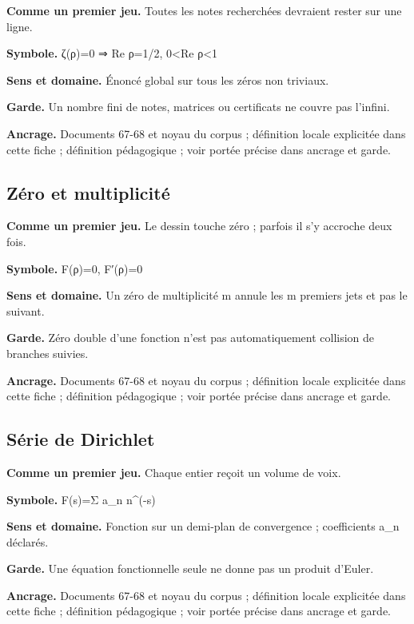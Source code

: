 \documentclass[
  9pt,
  a4paper,
]{article}
\begin{document}
\textbf{Comme un premier jeu.} Toutes les notes recherchées devraient
rester sur une ligne.

\textbf{Symbole.} ζ(ρ)=0 ⇒ Re ρ=1/2, 0\textless Re ρ\textless1

\textbf{Sens et domaine.} Énoncé global sur tous les zéros non triviaux.

\textbf{Garde.} Un nombre fini de notes, matrices ou certificats ne
couvre pas l'infini.

\textbf{Ancrage.} Documents 67-68 et noyau du corpus ; définition locale
explicitée dans cette fiche ; définition pédagogique ; voir portée
précise dans ancrage et garde.

\hypertarget{zuxe9ro-et-multiplicituxe9}{%
\subsection{Zéro et multiplicité}\label{zuxe9ro-et-multiplicituxe9}}

\textbf{Comme un premier jeu.} Le dessin touche zéro ; parfois il s'y
accroche deux fois.

\textbf{Symbole.} F(ρ)=0, F′(ρ)=0

\textbf{Sens et domaine.} Un zéro de multiplicité m annule les m
premiers jets et pas le suivant.

\textbf{Garde.} Zéro double d'une fonction n'est pas automatiquement
collision de branches suivies.

\textbf{Ancrage.} Documents 67-68 et noyau du corpus ; définition locale
explicitée dans cette fiche ; définition pédagogique ; voir portée
précise dans ancrage et garde.

\hypertarget{suxe9rie-de-dirichlet}{%
\subsection{Série de Dirichlet}\label{suxe9rie-de-dirichlet}}

\textbf{Comme un premier jeu.} Chaque entier reçoit un volume de voix.

\textbf{Symbole.} F(s)=Σ a\_n n\^{}(-s)

\textbf{Sens et domaine.} Fonction sur un demi-plan de convergence ;
coefficients a\_n déclarés.

\textbf{Garde.} Une équation fonctionnelle seule ne donne pas un produit
d'Euler.

\textbf{Ancrage.} Documents 67-68 et noyau du corpus ; définition locale
explicitée dans cette fiche ; définition pédagogique ; voir portée
précise dans ancrage et garde.
\end{document}
